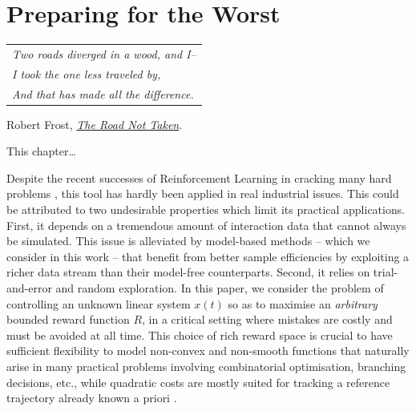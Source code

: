 
\graphicspath{{2-Chapters/7-Chapter/}}

\chapter{Preparing for the Worst}
\label{chapter:7}

\begin{flushright}
	\begin{tabular}{@{}l@{}}
		\emph{Two roads diverged in a wood, and I--}\\
		\emph{I took the one less traveled by,}\\
		\emph{And that has made all the difference.}\\
	\end{tabular}
	
	Robert Frost, \href{https://eleurent.github.io/sisyphe/texts/the-road-not-taken.html}{\emph{The Road Not Taken}}.
\end{flushright}

\abstractStartChapter{}%
This chapter\dots
\minitocStartChapter{}


Despite the recent successes of Reinforcement Learning in cracking many hard problems \citep[e.g.][]{mnih2015humanlevel,Silver1140}, this tool has hardly been applied in real industrial issues. This could be attributed to two undesirable properties which limit its practical applications. First, it depends on a tremendous amount of interaction data that cannot always be simulated. This issue is alleviated by model-based methods -- which we consider in this work -- that benefit from better sample efficiencies by exploiting a richer data stream than their model-free counterparts. Second, it relies on trial-and-error and random exploration. In this paper, we consider the problem of controlling an unknown linear system $x(t)$ so as to maximise an \emph{arbitrary} bounded reward function $R$, in a critical setting where mistakes are costly and must be avoided at all time. 
This choice of rich reward space is crucial to have sufficient flexibility to model non-convex and non-smooth functions that naturally arise in many practical problems involving combinatorial optimisation, branching decisions, etc., while quadratic costs are mostly suited for tracking a reference trajectory already known a priori \citep[e.g.][]{Kumar2013}.

